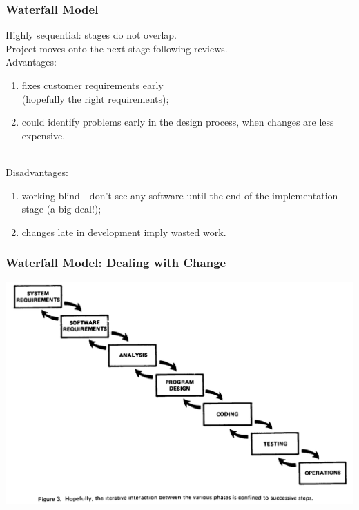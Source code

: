 \begin{frame}
\frametitle{Waterfall Model}

\begin{changemargin}{1cm}
Highly sequential: stages do not overlap.\\
Project moves onto the next stage following reviews.\\[1em]

Advantages: 
\begin{enumerate}
\item fixes customer requirements early\\ (hopefully the right requirements); 
\item could identify
problems early in the design process, when changes are less expensive.
\end{enumerate}
~\\[1em]
Disadvantages: 
\begin{enumerate}
\item working blind---don't see any
software until the end of the implementation stage (a big deal!);
\item changes late in development imply wasted work.
\end{enumerate}

\end{changemargin}
\end{frame}

\begin{frame}
\frametitle{Waterfall Model: Dealing with Change}

\begin{center}
\includegraphics[height=.7\textheight]{images/more-ideal-iteration}
\end{center}

\end{frame}


